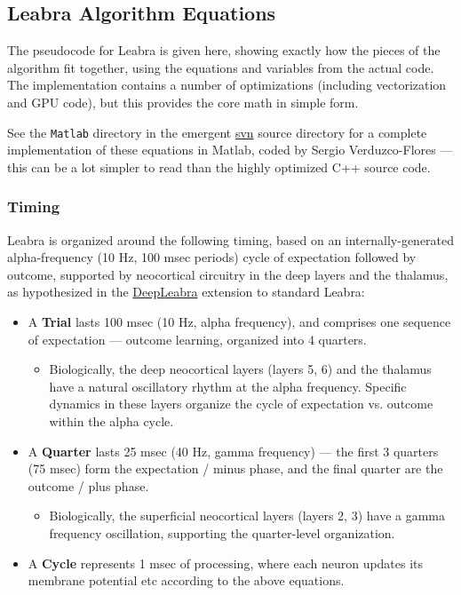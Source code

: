 \providecommand{\tightlist}{%
  \setlength{\itemsep}{0pt}\setlength{\parskip}{0pt}}

\subsection{Leabra Algorithm
Equations}\label{leabra-algorithm-equations}

The pseudocode for Leabra is given here, showing exactly how the pieces
of the algorithm fit together, using the equations and variables from
the actual code. The implementation contains a number of optimizations
(including vectorization and GPU code), but this provides the core math
in simple form.

See the \texttt{Matlab} directory in the emergent \url{svn} source
directory for a complete implementation of these equations in Matlab,
coded by Sergio Verduzco-Flores --- this can be a lot simpler to read
than the highly optimized C++ source code.

\subsubsection{Timing}\label{timing}

Leabra is organized around the following timing, based on an
internally-generated alpha-frequency (10 Hz, 100 msec periods) cycle of
expectation followed by outcome, supported by neocortical circuitry in
the deep layers and the thalamus, as hypothesized in the
\url{DeepLeabra} extension to standard Leabra:

\begin{itemize}
\tightlist
\item
  A \textbf{Trial} lasts 100 msec (10 Hz, alpha frequency), and
  comprises one sequence of expectation --- outcome learning, organized
  into 4 quarters.

  \begin{itemize}
  \tightlist
  \item
    Biologically, the deep neocortical layers (layers 5, 6) and the
    thalamus have a natural oscillatory rhythm at the alpha frequency.
    Specific dynamics in these layers organize the cycle of expectation
    vs. outcome within the alpha cycle.
  \end{itemize}
\item
  A \textbf{Quarter} lasts 25 msec (40 Hz, gamma frequency) --- the
  first 3 quarters (75 msec) form the expectation / minus phase, and the
  final quarter are the outcome / plus phase.

  \begin{itemize}
  \tightlist
  \item
    Biologically, the superficial neocortical layers (layers 2, 3) have
    a gamma frequency oscillation, supporting the quarter-level
    organization.
  \end{itemize}
\item
  A \textbf{Cycle} represents 1 msec of processing, where each neuron
  updates its membrane potential etc according to the above equations.
\end{itemize}

